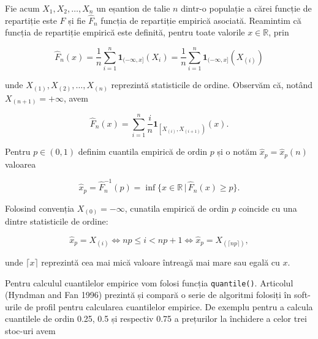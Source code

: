 \documentclass[]{article}
\newenvironment{Shaded}{\begin{snugshade}}{\end{snugshade}}
\newcommand{\KeywordTok}[1]{\textcolor[rgb]{0.13,0.29,0.53}{\textbf{#1}}}
\newcommand{\DataTypeTok}[1]{\textcolor[rgb]{0.13,0.29,0.53}{#1}}
\newcommand{\DecValTok}[1]{\textcolor[rgb]{0.00,0.00,0.81}{#1}}
\newcommand{\FloatTok}[1]{\textcolor[rgb]{0.00,0.00,0.81}{#1}}
\newcommand{\StringTok}[1]{\textcolor[rgb]{0.31,0.60,0.02}{#1}}
\newcommand{\OperatorTok}[1]{\textcolor[rgb]{0.81,0.36,0.00}{\textbf{#1}}}
\newcommand{\NormalTok}[1]{#1}
\begin{document}
Fie acum \(X_1,X_2,\ldots,X_n\) un eșantion de talie \(n\) dintr-o
populație a cărei funcție de repartiție este \(F\) și fie \(\hat{F}_n\)
funcția de repartiție empirică asociată. Reamintim că funcția de
repartiție empirică este definită, pentru toate valorile
\(x\in\mathbb{R}\), prin

\[
  \hat{F}_n(x) = \frac{1}{n}\sum_{i = 1}^{n}\mathbf{1}_{(-\infty, x]}(X_i) = \frac{1}{n}\sum_{i = 1}^{n}\mathbf{1}_{(-\infty, x]}(X_{(i)})
\]

unde \(X_{(1)}, X_{(2)}, \ldots, X_{(n)}\) reprezintă statisticile de
ordine. Observăm că, notând \(X_{(n+1)} = +\infty\), avem

\[
  \hat{F}_n(x) = \sum_{i = 1}^{n}\frac{i}{n}\mathbf{1}_{\left[X_{(i)}, X_{(i+1)}\right)}(x).
\]

Pentru \(p\in(0,1)\) definim cuantila empirică de ordin \(p\) și o notăm
\(\hat{x}_p = \hat{x}_p(n)\) valoarea

\[
  \hat{x}_p = \hat{F}_n^{-1}(p) = \inf\{x\in\mathbb{R}\,|\,\hat{F}_n(x)\geq p\}.
\]

Folosind convenția \(X_{(0)}=-\infty\), cunatila empirică de ordin \(p\)
coincide cu una dintre statisticile de ordine:

\[
  \hat{x}_p = X_{(i)} \iff np\leq i< np+1 \iff \hat{x}_p = X_{(\lceil np \rceil)},
\]

unde \(\lceil x \rceil\) reprezintă cea mai mică valoare întreagă mai
mare sau egală cu \(x\).

Pentru calculul cuantilelor empirice vom folosi funcția
\texttt{quantile()}. Articolul (Hyndman and Fan 1996) prezintă și
compară o serie de algoritmi folosiți în soft-urile de profil pentru
calcularea cuantilelor empirice. De exemplu pentru a calcula cuantilele
de ordin 0.25, 0.5 și respectiv 0.75 a prețurilor la închidere a celor
trei stoc-uri avem

\begin{Shaded}
\end{Shaded}
\end{document}

